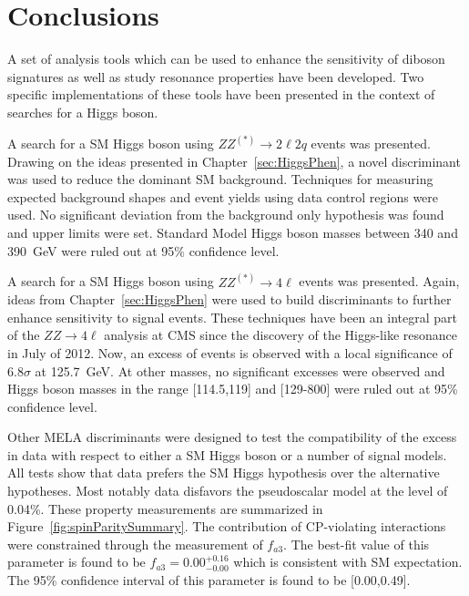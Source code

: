\chapter{Conclusions}
\label{sec:Conclusions}

A set of analysis tools which can be used to enhance the
sensitivity of diboson signatures as well as study resonance
properties have been developed.  Two specific implementations 
of these tools have been presented in the context of searches
for a Higgs boson. 

A search for a SM Higgs boson using $ZZ^{(*)}\to2\ell2q$ events
was presented.  
Drawing on the ideas presented in Chapter~\ref{sec:HiggsPhen},
a novel discriminant was used to reduce the dominant SM
background. 
Techniques for measuring expected background
shapes and event yields using data control regions were used.
No significant deviation from the background 
only hypothesis was found and upper limits were set.
Standard Model Higgs boson masses between 340 and 390~GeV
were ruled out at 95\% confidence level.

A search for a SM Higgs boson using $ZZ^{(*)}\to4\ell$ events
was presented.  Again, ideas from Chapter~\ref{sec:HiggsPhen} 
were used to build discriminants to further enhance sensitivity
to signal events.  These techniques have been an integral part
of the $ZZ\to4\ell$ analysis at CMS since the discovery of the 
Higgs-like resonance in July of 2012.  
Now, an excess of events is observed with a local significance
of $6.8\sigma$ at 125.7~GeV.  
At other masses, no significant excesses were observed 
and Higgs boson masses in the range [114.5,119] and [129-800]
were ruled out at 95\% confidence level. 

Other MELA discriminants were designed to test the
compatibility of the excess in data with respect to either
a SM Higgs boson or a number of signal models.  All 
tests show that data prefers the SM Higgs hypothesis over
the alternative hypotheses.  Most notably data disfavors the 
pseudoscalar model at the level of 0.04\%.  These property
measurements are summarized in Figure~\ref{fig:spinParitySummary}.
The contribution of CP-violating 
interactions were constrained through the measurement of $f_{a3}$.
The best-fit value of this parameter is found to be 
$f_{a3}=0.00^{+0.16}_{-0.00}$ which is consistent with SM expectation.  The 95\% confidence interval of this parameter is found to be 
[0.00,0.49].

